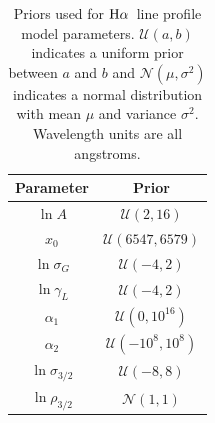 \documentclass[modern, letterpaper]{aastex61}
\newcommand{\Ha}{\ensuremath{{\rm H}\alpha}}
\begin{document}
\begin{table}[ht]
  \begin{center}
    \begin{tabular}{ c | c }
      \toprule
        Parameter & Prior \\\toprule
        $\ln A$ & $\mathcal{U}(2, 16)$\\
        $x_0$ & $\mathcal{U}(6547, 6579)$\\
        $\ln\sigma_G$ & $\mathcal{U}(-4, 2)$\\
        $\ln\gamma_L$ & $\mathcal{U}(-4, 2)$\\
        $\alpha_1$ & $\mathcal{U}(0, 10^{16})$\\
        $\alpha_2$ & $\mathcal{U}(-10^8, 10^8)$\\
        $\ln\sigma_{3/2}$ & $\mathcal{U}(-8, 8)$\\
        $\ln\rho_{3/2}$ & $\mathcal{N}(1, 1)$\\
      \bottomrule
    \end{tabular}
    \caption{
      Priors used for \Ha\ line profile model parameters.
      $\mathcal{U}(a, b)$ indicates a uniform prior between $a$ and $b$ and
      $\mathcal{N}(\mu, \sigma^2)$ indicates a normal distribution with mean
      $\mu$ and variance $\sigma^2$.
      Wavelength units are all angstroms.
      \label{tbl:prior-bounds}
    }
  \end{center}
\end{table}
\end{document}
